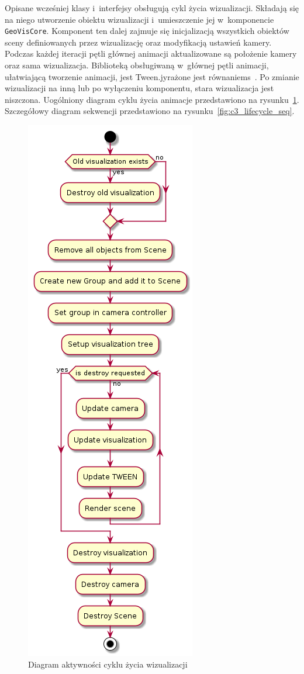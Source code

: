Opisane wcześniej klasy i~interfejsy obsługują cykl życia wizualizacji. Składają się na niego utworzenie obiektu wizualizacji i~umieszczenie jej w~komponencie \texttt{GeoVisCore}. Komponent ten dalej zajmuje się inicjalizacją wszystkich obiektów sceny definiowanych przez wizualizację oraz modyfikacją ustawień kamery. Podczas każdej iteracji pętli głównej animacji aktualizowane są położenie kamery oraz sama wizualizacja. Biblioteką obsługiwaną w~głównej pętli animacji, ułatwiającą tworzenie animacji, jest Tween.jyrażone jest równaniems~\cite{TWEEN}. Po zmianie wizualizacji na inną lub po wyłączeniu komponentu, stara wizualizacja jest niszczona. Uogólniony diagram cyklu życia animacje przedstawiono na rysunku~\ref{fig:c3_lifecycle}. Szczegółowy diagram sekwencji przedstawiono na rysunku~\ref{fig:c3_lifecycle_seq}. 

\begin{figure}
    \centering
    \includegraphics[scale=0.6]{diagrams/out/c3_lifecycle.png}
    \caption{Diagram aktywności cyklu życia wizualizacji}
    \label{fig:c3_lifecycle}
\end{figure}

